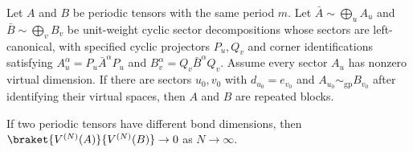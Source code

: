 \begin{lemma}%
    \label{thm:periodic_overlap_gauge_equiv_sector_match}
    \leanok
    Let $A$ and $B$ be periodic tensors with the same period $m$. Let
    $\bar A\sim\bigoplus_u A_u$ and $\bar B\sim\bigoplus_v B_v$ be unit-weight
    cyclic sector decompositions whose sectors are left-canonical, with
    specified cyclic projectors $P_u,Q_v$ and corner identifications satisfying
    $A_u^\alpha=P_u\bar A^\alpha P_u$ and
    $B_v^\alpha=Q_v\bar B^\alpha Q_v$.
    Assume
    every sector $A_u$ has nonzero virtual dimension. If there are sectors
    $u_0,v_0$ with $d_{u_0}=e_{v_0}$ and
    $A_{u_0}\sim_{\mathrm{gp}}B_{v_0}$ after identifying their virtual spaces,
    then $A$ and $B$ are repeated blocks.
\end{lemma}

\begin{lemma}%
    \label{thm:periodic_overlap_zero_ne_dim}
    \leanok
    If two periodic tensors have different bond dimensions, then
    $\braket{V^{(N)}(A)}{V^{(N)}(B)} \to 0$ as $N\to\infty$.
\end{lemma}


